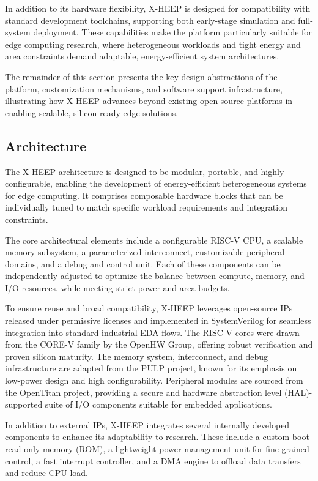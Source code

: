         In addition to its hardware flexibility, \mbox{X-HEEP} is designed for compatibility with standard development toolchains, supporting both early-stage simulation and full-system deployment. These capabilities make the platform particularly suitable for edge computing research, where heterogeneous workloads and tight energy and area constraints demand adaptable, energy-efficient system architectures.
        
        The remainder of this section presents the key design abstractions of the platform, customization mechanisms, and software support infrastructure, illustrating how \mbox{X-HEEP} advances beyond existing open-source platforms in enabling scalable, silicon-ready edge solutions.
        
        \subsection{Architecture}
        
            The \mbox{X-HEEP} architecture is designed to be modular, portable, and highly configurable, enabling the development of energy-efficient heterogeneous systems for edge computing. It comprises composable hardware blocks that can be individually tuned to match specific workload requirements and integration constraints.
            
            The core architectural elements include a configurable RISC-V CPU, a scalable memory subsystem, a parameterized interconnect, customizable peripheral domains, and a debug and control unit. Each of these components can be independently adjusted to optimize the balance between compute, memory, and I/O resources, while meeting strict power and area budgets.
            
            To ensure reuse and broad compatibility, \mbox{X-HEEP} leverages open-source IPs released under permissive licenses and implemented in SystemVerilog for seamless integration into standard industrial EDA flows. The RISC-V cores were drawn from the CORE-V family by the OpenHW Group, offering robust verification and proven silicon maturity. The memory system, interconnect, and debug infrastructure are adapted from the PULP project, known for its emphasis on low-power design and high configurability. Peripheral modules are sourced from the OpenTitan project, providing a secure and hardware abstraction level (HAL)-supported suite of I/O components suitable for embedded applications.
            
            In addition to external IPs, \mbox{X-HEEP} integrates several internally developed components to enhance its adaptability to research. These include a custom boot read-only memory (ROM), a lightweight power management unit for fine-grained control, a fast interrupt controller, and a DMA engine to offload data transfers and reduce CPU load.

